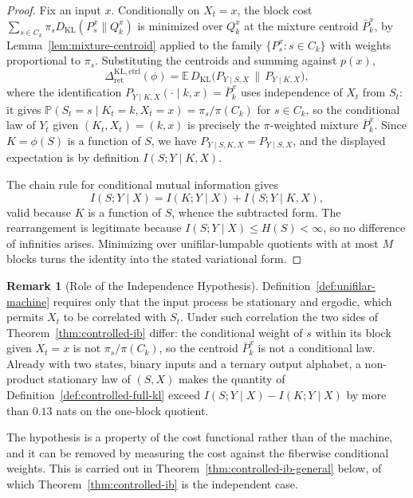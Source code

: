\documentclass[12pt]{article}
\theoremstyle{definition}
\newtheorem{remark}[theorem]{Remark}
\newcommand{\RetKLc}{\Delta_{\mathrm{ret}}^{\mathrm{KL,ctrl}}}
\begin{document}
\begin{proof}
Fix an input $x$.  Conditionally on $X_t=x$, the block cost
$\sum_{s\in C_k}\pi_sD_{\mathrm{KL}}(P_s^x\|Q_k^x)$ is minimized over $Q_k^x$
at the mixture centroid $\bar P_k^x$, by Lemma~\ref{lem:mixture-centroid}
applied to the family $\{P_s^x:s\in C_k\}$ with weights proportional to
$\pi_s$.  Substituting the centroids and summing against $p(x)$,
\[
\RetKLc(\phi)
=
\mathbb E\,D_{\mathrm{KL}}
\bigl(P_{Y\mid S,X}\,\big\|\,P_{Y\mid K,X}\bigr),
\]
where the identification $P_{Y\mid K,X}(\cdot\mid k,x)=\bar P_k^x$ uses
independence of $X_t$ from $S_t$: it gives
$\mathbb P(S_t=s\mid K_t=k,X_t=x)=\pi_s/\pi(C_k)$ for $s\in C_k$, so the
conditional law of $Y_t$ given $(K_t,X_t)=(k,x)$ is precisely the
$\pi$-weighted mixture $\bar P_k^x$.  Since $K=\phi(S)$ is a function of $S$,
we have $P_{Y\mid S,K,X}=P_{Y\mid S,X}$, and the displayed expectation is by
definition $I(S;Y\mid K,X)$.

The chain rule for conditional mutual information gives
\[
I(S;Y\mid X)=I(K;Y\mid X)+I(S;Y\mid K,X),
\]
valid because $K$ is a function of $S$, whence the subtracted form.  The
rearrangement is legitimate because $I(S;Y\mid X)\le H(S)<\infty$, so no
difference of infinities arises.  Minimizing over unifilar-lumpable quotients
with at most $M$ blocks turns the identity into the stated variational form.
\end{proof}

\begin{remark}[Role of the Independence Hypothesis]
\label{rem:controlled-ib-independence}
Definition~\ref{def:unifilar-machine} requires only that the input process be
stationary and ergodic, which permits $X_t$ to be correlated with $S_t$.  Under
such correlation the two sides of Theorem~\ref{thm:controlled-ib} differ: the
conditional weight of $s$ within its block given $X_t=x$ is not
$\pi_s/\pi(C_k)$, so the centroid $\bar P_k^x$ is not a conditional law.
Already with two states, binary inputs and a ternary output alphabet, a
non-product stationary law of $(S,X)$ makes the quantity of
Definition~\ref{def:controlled-full-kl} exceed $I(S;Y\mid X)-I(K;Y\mid X)$ by
more than $0.13$ nats on the one-block quotient.

The hypothesis is a property of the cost functional rather than of the
machine, and it can be removed by measuring the cost against the fiberwise
conditional weights.  This is carried out in
Theorem~\ref{thm:controlled-ib-general} below, of which
Theorem~\ref{thm:controlled-ib} is the independent case.
\end{remark}
\end{document}
